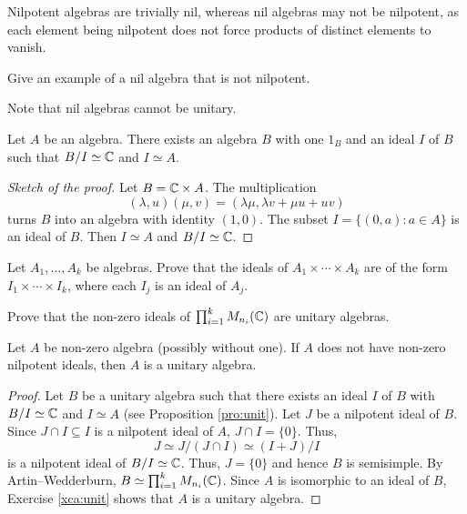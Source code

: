 Nilpotent algebras are trivially nil, whereas nil algebras may not be nilpotent, as each element being nilpotent does not force products of distinct elements to vanish.

\begin{exercise}
    Give an example of a nil algebra that is not nilpotent. 
\end{exercise}

Note that nil algebras cannot be unitary. 

\begin{proposition}
\label{pro:unit}
    Let $A$ be an algebra. There exists an algebra $B$ 
    with one $1_B$ and an ideal $I$ of $B$ 
    such that $B/I\simeq\mathbb{C}$ and $I\simeq A$. 
\end{proposition}

\begin{proof}[Sketch of the proof]
    Let $B=\mathbb{C}\times A$. The multiplication  
    \[
    (\lambda,u)(\mu,v)=(\lambda\mu,\lambda v+\mu u+uv)
    \]
    turns $B$ into an algebra with identity $(1,0)$. The subset
    $I=\{(0,a):a\in A\}$ is an ideal of $B$. Then $I\simeq A$ 
    and $B/I\simeq\mathbb{C}$. 
\end{proof}

\begin{exercise}
Let $A_1,\dots,A_k$ be algebras. 
Prove that the ideals of $A_1\times\cdots\times A_k$ 
are of the form $I_1\times\cdots\times I_k$, where
each $I_j$ is an ideal of $A_j$.  
\end{exercise}

\begin{exercise}
\label{xca:unit}
    Prove that the non-zero ideals of 
    $\prod_{i=1}^k M_{n_i}(\mathbb{C})$ are unitary algebras.  
\end{exercise}

\begin{proposition}
    Let $A$ be non-zero algebra (possibly without one). If $A$ 
    does not have non-zero nilpotent 
    ideals, then $A$ is a unitary algebra. 
\end{proposition}

\begin{proof}
    Let $B$ be a unitary algebra such that there exists
    an ideal $I$ of $B$ with $B/I\simeq\mathbb{C}$ and $I\simeq A$ 
    (see Proposition \ref{pro:unit}). Let $J$ be 
    a nilpotent ideal of $B$. Since $J\cap I\subseteq I$ is a nilpotent
    ideal of $A$, 
    $J\cap I=\{0\}$. Thus, 
    \[
    J\simeq J/(J\cap I)\simeq (I+J)/I
    \]
    is a nilpotent ideal of $B/I\simeq\mathbb{C}$. Thus, $J=\{0\}$ 
    and hence $B$ is semisimple. By Artin--Wedderburn, 
    $B\simeq\prod_{i=1}^k M_{n_i}(\mathbb{C})$. Since $A$ is isomorphic to an ideal of 
    $B$, Exercise \ref{xca:unit} shows
    that $A$ is a unitary algebra. 
\end{proof}


